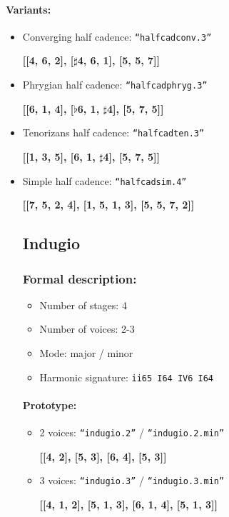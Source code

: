 ﻿\documentclass[11pt, openany]{article}
\begin{document}
\paragraph{Variants:}
\begin{itemize}
\item Converging half cadence: \texttt{“halfcadconv.3”}
	\begin{center}
	\textbf{[[4, 6, 2], [$\sharp$4, 6, 1], [5, 5, 7]]}
	\end{center}
\item Phrygian half cadence: \texttt{“halfcadphryg.3”}
	\begin{center}
	\textbf{[[6, 1, 4], [$\flat$6, 1, $\sharp$4], [5, 7, 5]]}
	\end{center}
\item Tenorizans half cadence: \texttt{“halfcadten.3”}
	\begin{center}
	\textbf{[[1, 3, 5], [6, 1, $\sharp$4], [5, 7, 5]]}
	\end{center}
\item Simple half cadence: \texttt{“halfcadsim.4”}
	\begin{center}
	\textbf{[[7, 5, 2, 4], [1, 5, 1, 3], [5, 5, 7, 2]]}
	\end{center}


	\subsection{Indugio}
	
\subsubsection{Formal description:}
\begin{itemize}
\item Number of stages: 4
\item Number of voices: 2-3
\item Mode: major / minor
\item Harmonic signature: \texttt{ii65 I64 IV6 I64}
\end{itemize}

\paragraph{Prototype:}
\begin{itemize}
\item 2 voices: \texttt{“indugio.2”} / \texttt{“indugio.2.min”}
	\begin{center}
	\textbf{[[4, 2], [5, 3], [6, 4], [5, 3]]}
	\end{center}
\item 3 voices: \texttt{“indugio.3”} / \texttt{“indugio.3.min”}
	\begin{center}
	\textbf{[[4, 1, 2], [5, 1, 3], [6, 1, 4], [5, 1, 3]]}
	\end{center}
\end{itemize}


\end{itemize}
\end{document}
